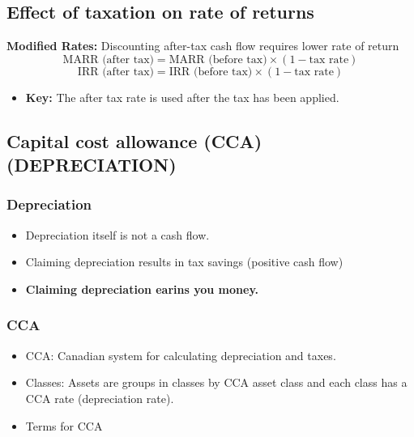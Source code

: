 \subsection{Effect of taxation on rate of returns}
\begin{definition} \textbf{Modified Rates:} Discounting after-tax cash flow requires lower rate of return
    \begin{equation}
        \text{MARR (after tax)} = \text{MARR (before tax)} \times (1 - \text{tax rate})
    \end{equation}
    \begin{equation}
        \text{IRR (after tax)} = \text{IRR (before tax)} \times (1 - \text{tax rate})
    \end{equation}
    \begin{itemize}
        \item \textbf{Key:} The after tax rate is used after the tax has been applied. 
    \end{itemize}
\end{definition}

\subsection{Capital cost allowance (CCA) (DEPRECIATION)}
\subsubsection{Depreciation}
\begin{intuition}
    \begin{itemize}
        \item Depreciation itself is not a cash flow. 
        \item Claiming depreciation results in tax savings (positive cash flow)
        \item \textbf{Claiming depreciation earins you money.}
    \end{itemize}
\end{intuition}

\subsubsection{CCA}
\begin{terminology}
    \begin{itemize}
        \item CCA: Canadian system for calculating depreciation and taxes.
        \item Classes: Assets are groups in classes by CCA asset class and each class has a CCA rate (depreciation rate).
        \item Terms for CCA
    \end{itemize}
\end{terminology}


